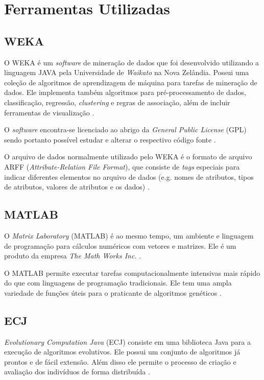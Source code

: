 \documentclass[conference]{IEEEtran}
\begin{document}
\section{Ferramentas Utilizadas}
\subsection{WEKA}
O WEKA é um {\it software} de mineração de dados que foi desenvolvido utilizando a linguagem JAVA pela Universidade de {\it Waikato} na Nova Zelândia. Possui uma coleção de algoritmos de aprendizagem de máquina para tarefas de mineração de dados. Ele implementa também algoritmos para pré-processamento de dados, classificação, regressão, {\it clustering} e regras de associação, além de incluir ferramentas de visualização \cite{IEEEhowto:fauzi}. 

O {\it software} encontra-se licenciado ao abrigo da {\it General Public License} (GPL) sendo portanto possível estudar e alterar o respectivo código fonte \cite{IEEEhowto:fauzi}.

O arquivo de dados normalmente utilizado pelo WEKA é o formato de arquivo ARFF ({\it Attribute-Relation File Format}), que consiste de {\it tags} especiais para indicar diferentes elementos no arquivo de dados (e.g. nomes de atributos, tipos de atributos, valores de atributos e os dados) \cite{IEEEhowto:fauzi}.

\subsection{MATLAB} 

O {\it Matrix Laboratory} (MATLAB) é ao mesmo tempo, um ambiente e linguagem de programação para cálculos numéricos com vetores e matrizes. Ele é um produto da empresa {\it The Math Works Inc.} \cite{IEEEhowto:ortega}. 

O MATLAB permite executar tarefas computacionalmente intensivas mais rápido do que com linguagens de programação tradicionais. Ele tem uma ampla variedade de funções úteis para o praticante de algoritmos genéticos \cite{IEEEhowto:furtado}.

\subsection{ECJ}

\textit{Evolutionary Computation Java} (ECJ) consiste em uma biblioteca Java para a execução de algoritmos evolutivos. Ele possui um conjunto de algoritmos já prontos e de fácil extensão. Além disso ele permite o processo de criação e avaliação dos indivíduos de forma distribuída \cite{sean2013}.
\end{document}
